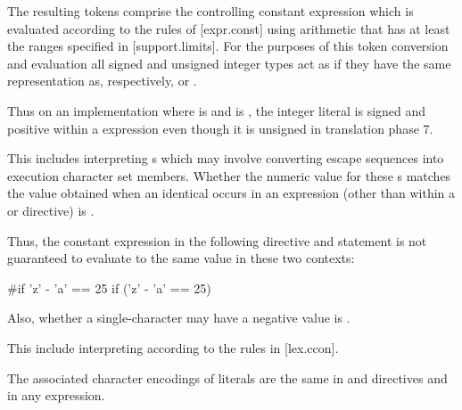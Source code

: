 \documentclass{wg21}
\begin{document}
\pnum
The resulting tokens comprise the controlling constant expression
which is evaluated according to the rules of [expr.const]
using arithmetic that has at least the ranges specified
in [support.limits]. For the purposes of this token conversion and evaluation
all signed and unsigned integer types
act as if they have the same representation as, respectively,
 or .
\begin{note}
    Thus on an
    implementation where  is 
    and  is ,
    the integer literal  is signed and positive within a 
    expression even though it is unsigned in translation phase
    7.
\end{note}
\begin{removedblock}
This includes interpreting s which may involve
converting escape sequences into execution character set members.
Whether the numeric value for these s
matches the value obtained when an identical 
occurs in an expression
(other than within a
or
directive)
is .
\begin{note}
    Thus, the constant expression in the following
    directive and
     statement
    is not guaranteed to evaluate to the same value in these two
    contexts:
    \begin{codeblock}
        #if 'z' - 'a' == 25
        if ('z' - 'a' == 25)
    \end{codeblock}
\end{note}
Also, whether a single-character  may have a negative
value is .
\end{removedblock}
\begin{addedblock}
This include interpreting  according to the rules in [lex.ccon].
\begin{note}
The associated character encodings of literals are the same in  and  directives and in any expression.
\end{note}
\end{addedblock}
\end{document}
